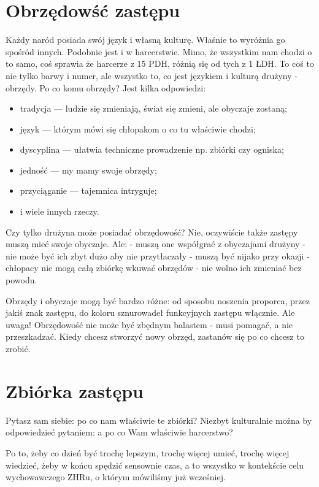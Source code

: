 \section{Obrzędowść zastępu}
Każdy naród posiada swój język i własną kulturę. Właśnie to wyróżnia go spośród innych. Podobnie jest i w  harcerstwie. Mimo, że wszystkim nam  chodzi o to samo, coś sprawia że harcerze z 15 PDH, różnią się od tych z 1 ŁDH. To  coś  to  nie  tylko  barwy i numer, ale wszystko to, co jest językiem i kulturą drużyny - obrzędy.
	Po co komu obrzędy? Jest  kilka  odpowiedzi:
\begin{itemize}[noitemsep,nolistsep] 
\item  tradycja --- ludzie się zmieniają,  świat się zmieni,  ale obyczaje zostaną;
\item  język --- którym mówi się chłopakom o co tu  właściwie chodzi;
\item  dyscyplina --- ułatwia techniczne prowadzenie np. zbiórki czy ogniska;
\item  jedność --- my mamy swoje obrzędy;
\item  przyciąganie ---  tajemnica intryguje;
\item  i wiele innych rzeczy.
\end{itemize}
	Czy tylko drużyna może posiadać obrzędowość? Nie, oczywiście także zastępy muszą mieć swoje obyczaje. Ale:
-  muszą one współgrać z obyczajami drużyny
- nie może być  ich zbyt  dużo  aby  nie  przytłaczały
- muszą być nijako przy  okazji - chłopacy nie mogą całą zbiórkę wkuwać obrzędów
- nie wolno ich zmieniać bez powodu.

	Obrzędy i obyczaje  mogą  być  bardzo  różne:  od  sposobu  noszenia  proporca, przez  jakiś  znak  zastępu,  do  koloru  sznurowadeł  funkcyjnych zastępu  włącznie.  Ale uwaga! Obrzędowość nie  może być zbędnym balastem - musi pomagać, a nie  przeszkadzać.
	Kiedy chcesz stworzyć nowy obrzęd,  zastanów się po co chcesz to  zrobić. 
	
	
\section{Zbiórka zastępu}

Pytasz sam siebie: po co nam właściwie te zbiórki? 
Niezbyt kulturalnie można by odpowiedzieć pytaniem: a po co Wam właściwie harcerstwo?

Po to, żeby co dzień być trochę lepszym, trochę więcej umieć, trochę więcej wiedzieć, żeby  w końcu spędzić  sensownie czas, a to wszystko w kontekście celu wychowawczego ZHRu, o którym mówiliśmy już wcześniej.
	

